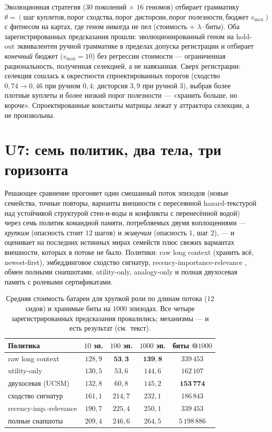 \documentclass{article}
\begin{document}
Эволюционная стратегия ($30$ поколений $\times$ $16$ геномов)
отбирает грамматику $\theta = (\text{шаг куплетов},
\text{порог сходства}, \text{порог дисторсии},
\text{порог полезности}, \text{бюджет } v_{\max})$ с фитнесом на
картах, где геном никогда не пел (стоимость $+$ $\lambda\cdot$биты).
Оба зарегистрированных предсказания прошли: эволюционированный геном
на hold-out эквивалентен ручной грамматике в пределах допуска
регистрации и отбирает \emph{конечный} бюджет ($v_{\max} = 10$) без
регрессии стоимости --- ограниченная рациональность, полученная
селекцией, а не навязанная. Сверх регистрации: селекция сошлась к
окрестности спроектированных порогов (сходство $0{,}74 \to 0{,}46$
при ручном $0{,}4$; дисторсия $3{,}9$ при ручной $3$), выбрав более
плотные куплеты и более низкий порог полезности --- «хранить больше,
но короче». Спроектированные константы матрицы лежат у аттрактора
селекции, а не произвольны.

\section{U7: семь политик, два тела, три горизонта}
\label{p5:sec:u7}

Решающее сравнение прогоняет один смешанный поток эпизодов (новые
семейства, точные повторы, варианты внешности с пересеянной
hazard-текстурой над устойчивой структурой стен-и-воды и конфликты с
перенесённой водой) через семь политик командной памяти, потребляемых
двумя воплощениями --- \emph{хрупким} (опасность стоит $12$ шагов) и
\emph{живучим} (опасность $1$, шаг $2$), --- и оценивает на последних
истинных мирах семейств плюс свежих вариантах внешности, которых в
потоке не было. Политики: raw long context (хранить всё,
newest-first), эмбеддинговое сходство сигнатур,
recency-importance-relevance \citep{genagents2023}, обмен полными
снапшотами, utility-only, analogy-only и полная двухосевая память с
ролевыми сертификатами.

\begin{table}[h]
\centering
\caption{Средняя стоимость батареи для хрупкой роли по длинам потока
($12$ сидов) и хранимые биты на $1000$ эпизодах. Все четыре
зарегистрированных предсказания провалились; механизмы --- и есть
результат (см.\ текст).}
\label{p5:tab:u7}
\small
\begin{tabular}{lcccc}
\toprule
Политика & $10$ эп. & $100$ эп. & $1000$ эп. & биты @$1000$ \\
\midrule
raw long context & $128{,}9$ & $\mathbf{53{,}3}$ & $\mathbf{139{,}8}$ & $339\,453$ \\
utility-only & $130{,}5$ & $53{,}6$ & $144{,}6$ & $162\,107$ \\
двухосевая (UCSM) & $132{,}8$ & $60{,}8$ & $145{,}2$ & $\mathbf{153\,774}$ \\
сходство сигнатур & $161{,}1$ & $214{,}7$ & $232{,}1$ & $186\,843$ \\
recency-imp.-relevance & $190{,}7$ & $225{,}4$ & $250{,}1$ & $339\,453$ \\
полные снапшоты & $209{,}4$ & $246{,}6$ & $264{,}5$ & $5\,198\,886$ \\
\bottomrule
\end{tabular}
\end{table}
\end{document}
